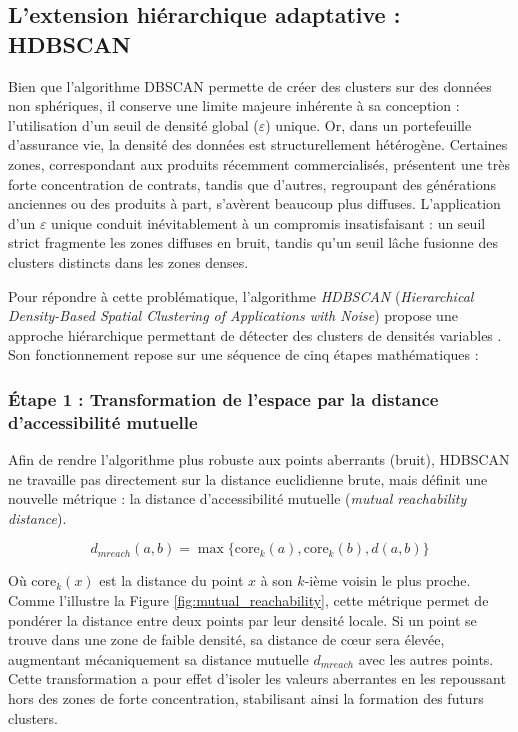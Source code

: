 \subsection{L'extension hiérarchique adaptative : HDBSCAN}
\label{sec:presentation_hdbscan}

Bien que l'algorithme DBSCAN permette de créer des clusters sur des données non sphériques, il conserve une limite majeure inhérente à sa conception : l'utilisation d'un seuil de densité global ($\varepsilon$) unique. Or, dans un portefeuille d'assurance vie, la densité des données est structurellement hétérogène. Certaines zones, correspondant aux produits récemment commercialisés, présentent une très forte concentration de contrats, tandis que d'autres, regroupant des générations anciennes ou des produits à part, s'avèrent beaucoup plus diffuses. L'application d'un $\varepsilon$ unique conduit inévitablement à un compromis insatisfaisant : un seuil strict fragmente les zones diffuses en bruit, tandis qu'un seuil lâche fusionne des clusters distincts dans les zones denses.

Pour répondre à cette problématique, l'algorithme \textit{HDBSCAN} (\textit{Hierarchical Density-Based Spatial Clustering of Applications with Noise}) propose une approche hiérarchique permettant de détecter des clusters de densités variables \cite{hdbscan}. Son fonctionnement repose sur une séquence de cinq étapes mathématiques :

\subsubsection*{Étape 1 : Transformation de l'espace par la distance d'accessibilité mutuelle}
Afin de rendre l'algorithme plus robuste aux points aberrants (bruit), HDBSCAN ne travaille pas directement sur la distance euclidienne brute, mais définit une nouvelle métrique : la distance d'accessibilité mutuelle (\textit{mutual reachability distance}). 

\begin{equation}
 d_{mreach}(a, b) = \max \{ \text{core}_k(a), \text{core}_k(b), d(a, b) \} 
\end{equation}

Où $\text{core}_k(x)$ est la distance du point $x$ à son $k$-ième voisin le plus proche. Comme l'illustre la Figure \ref{fig:mutual_reachability}, cette métrique permet de pondérer la distance entre deux points par leur densité locale. Si un point se trouve dans une zone de faible densité, sa distance de cœur sera élevée, augmentant mécaniquement sa distance mutuelle $d_{mreach}$ avec les autres points. Cette transformation a pour effet d'isoler les valeurs aberrantes en les repoussant hors des zones de forte concentration, stabilisant ainsi la formation des futurs clusters.

